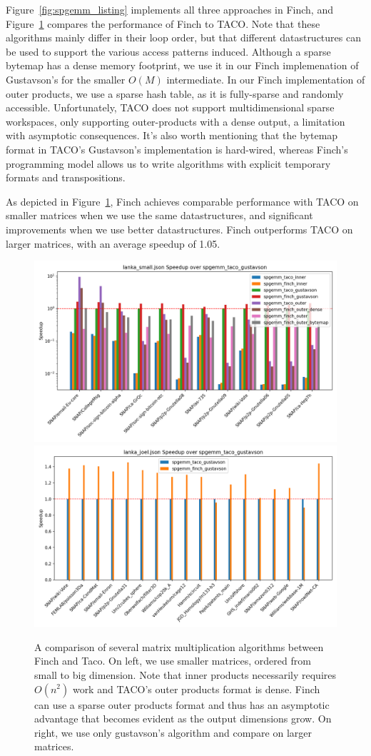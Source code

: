 Figure~\ref{fig:spgemm_listing} implements all three approaches in Finch, and Figure~\ref{fig:spgemm} compares the performance of Finch to TACO.
%
Note that these algorithms mainly differ in their loop order, but that different datastructures can be used to support the various access patterns induced.
%
Although a sparse bytemap has a dense memory footprint, we use it in our Finch implemenation of Gustavson's for the smaller $O(M)$ intermediate.
%
In our Finch implementation of outer products, we use a sparse hash table, as it is fully-sparse and randomly accessible.
%
Unfortunately, TACO does not support multidimensional sparse workspaces, only supporting outer-products with a dense output, a limitation with asymptotic consequences.
%
It's also worth mentioning that the bytemap format in TACO's Gustavson's implementation is hard-wired, whereas Finch's programming model allows us to write algorithms with explicit temporary formats and transpositions.

As depicted in Figure~\ref{fig:spgemm}, Finch achieves comparable performance with TACO on smaller matrices when we use the same datastructures, and significant improvements when we use better datastructures. Finch outperforms TACO on larger matrices, with an average speedup of 1.05. 

\begin{figure}
	\includegraphics[width=0.5\linewidth]{spgemm_small_speedup_log_scale.png}%
	\includegraphics[width=0.5\linewidth]{spgemm_joel_speedup.png}
    \caption{A comparison of several matrix multiplication algorithms between
    Finch and Taco. On left, we use smaller matrices, ordered from small to big
    dimension. Note that inner products necessarily requires $O(n^2)$ work and
    TACO's outer products format is dense. Finch can use a sparse outer products
    format and thus has an asymptotic advantage that becomes evident as the
    output dimensions grow. On right, we use only gustavson's algorithm and
    compare on larger matrices.}
    \label{fig:spgemm}
\end{figure}

